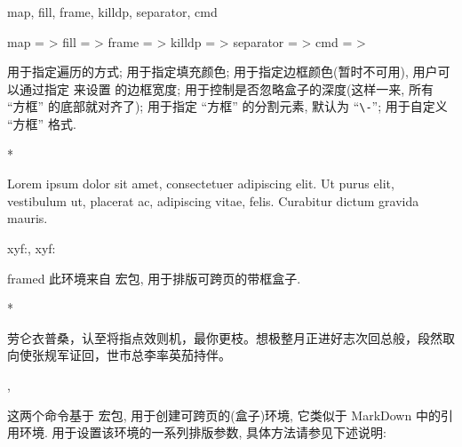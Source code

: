 \begin{keyval}[parent=ztex/box/hidetext]{map, fill, frame, killdp, separator, cmd}
  \begin{syntax}
    map       =  > 
    fill      =  > 
    frame     =  > 
    killdp    =  > 
    separator =  > \dval{\textbackslash-}
    cmd       =  > 
  \end{syntax}
   用于指定遍历的方式;  用于指定填充颜色;  用于指定边框颜色(暂时不可用),
  用户可以通过指定  来设置  的边框宽度;
   用于控制是否忽略盒子的深度(这样一来, 所有 ``方框'' 的底部就对齐了); 
  用于指定 ``方框'' 的分割元素, 默认为 ``\texttt{\textbackslash -}'';  用于自定义 ``方框'' 格式.
\end{keyval}
\begin{DocExample}*
{\setlength{\fboxsep}{0pt}
Lorem ipsum dolor sit amet, consectetuer adipiscing elit. Ut purus elit, vestibulum%
ut, placerat ac, adipiscing vitae, felis. Curabitur dictum gravida mauris.

xyf:,
xyf:

}
\end{DocExample}



\begin{function}[added=2025-07-10]{framed}
  此环境来自  宏包, 用于排版可跨页的带框盒子.
\end{function}
\begin{DocExample}*
\begin{framed}
劳仑衣普桑，认至将指点效则机，最你更枝。想极整月正进好志次回总般，段然取向使张规军证回，世市总李率英茄持伴。
\end{framed}
\end{DocExample}


\begin{function}[updated=2025-04-25]{\ztexframe, \ztexframeend}
  \begin{syntax}
  \end{syntax}
  这两个命令基于  宏包, 用于创建可跨页的(盒子)环境, 它类似于 MarkDown 中的引用环境. 
   用于设置该环境的一系列排版参数, 具体方法请参见下述说明:
\end{function}


